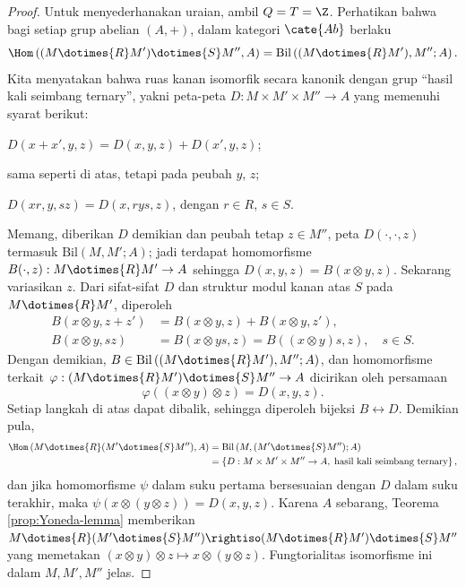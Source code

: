 \begin{proof}
	Untuk menyederhanakan uraian, ambil $Q = T = \Z$. Perhatikan bahwa bagi setiap grup abelian $(A, +)$, dalam kategori $\cate{Ab}$ berlaku
	\[ \Hom\left( (M \dotimes{R} M') \dotimes{S} M'', A \right) = \text{Bil}\left( (M \dotimes{R} M'), M''; A \right). \]
	Kita menyatakan bahwa ruas kanan isomorfik secara kanonik dengan grup ``hasil kali seimbang ternary'', yakni peta-peta $D: M \times M' \times M'' \to A$ yang memenuhi syarat berikut:
	\begin{compactenum}[(i)]
		\item $D(x+x', y, z) = D(x, y, z) + D(x', y, z)$;
		\item sama seperti di atas, tetapi pada peubah $y$, $z$;
		\item $D(xr, y, sz) = D(x, rys, z)$, dengan $r \in R$, $s \in S$.
	\end{compactenum}

	Memang, diberikan $D$ demikian dan peubah tetap $z \in M''$, peta $D(\cdot, \cdot, z)$ termasuk $\text{Bil}(M, M'; A)$; jadi terdapat homomorfisme $B(\cdot, z): M \dotimes{R} M' \to A$ sehingga $D(x,y,z) = B(x \otimes y, z)$. Sekarang variasikan $z$. Dari sifat-sifat $D$ dan struktur modul kanan atas $S$ pada $M \dotimes{R} M'$, diperoleh
	\begin{align*}
		B(x \otimes y, z + z') &= B(x \otimes y, z) + B(x \otimes y, z'), \\
		B(x \otimes y, sz) &= B(x \otimes ys, z) = B((x \otimes y)s, z), \quad s \in S.
	\end{align*}
	Dengan demikian, $B \in \text{Bil}\left( (M \dotimes{R} M'), M''; A \right)$, dan homomorfisme terkait $\varphi: (M \dotimes{R} M') \dotimes{S} M'' \to A$ dicirikan oleh persamaan
	\[ \varphi((x \otimes y) \otimes z) = D(x, y, z). \]
	Setiap langkah di atas dapat dibalik, sehingga diperoleh bijeksi $B \leftrightarrow D$. Demikian pula,
	\begin{align*}
		\Hom\left( M \dotimes{R} (M' \dotimes{S} M''), A \right) & = \text{Bil}\left( M, (M' \dotimes{S} M''); A \right)\\
		& = \left\{ D: M \times M' \times M'' \to A, \; \text{hasil kali seimbang ternary} \right\},
	\end{align*}
	dan jika homomorfisme $\psi$ dalam suku pertama bersesuaian dengan $D$ dalam suku terakhir, maka $\psi(x \otimes (y \otimes z)) = D(x,y,z)$. Karena $A$ sebarang, Teorema \ref{prop:Yoneda-lemma} memberikan $M \dotimes{R} (M' \dotimes{S} M'') \rightiso (M \dotimes{R} M') \dotimes{S} M''$ yang memetakan $(x \otimes y) \otimes z \mapsto x \otimes (y \otimes z)$. Fungtorialitas isomorfisme ini dalam $M, M', M''$ jelas.
\end{proof}

